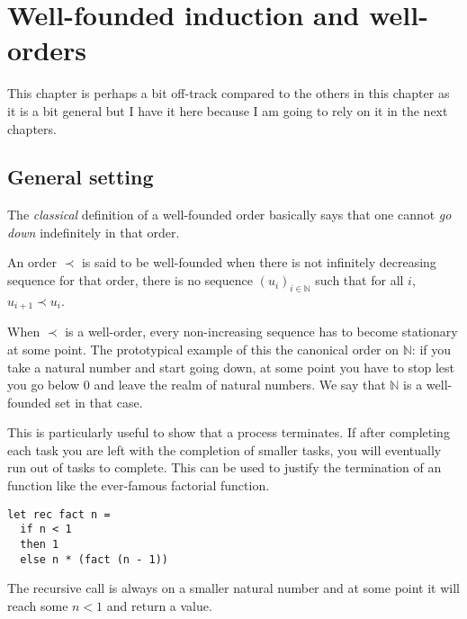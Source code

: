 \chapter{Well-founded induction and well-orders}

This chapter is perhaps a bit off-track compared to the others in this chapter
as it is a bit general but I have it here because I am going to rely on it in
the next chapters.

\section{General setting}

The \emph{classical} definition of a well-founded order basically says that one
cannot \emph{go down} indefinitely in that order.

\begin{definition}
  An order \(\prec\) is said to be well-founded when there is not infinitely
  decreasing sequence for that order, \ie there is no sequence
  \((u_i)_{i \in \mathbb{N}}\) such that for all \(i\), \(u_{i+1} \prec u_i\).
\end{definition}

When \(\prec\) is a well-order, every non-increasing sequence has to become
stationary at some point.
The prototypical example of this the canonical order on \(\mathbb{N}\): if you
take a natural number and start going down, at some point you have to stop lest
you go below \(0\) and leave the realm of natural numbers.
We say that \(\mathbb{N}\) is a well-founded set in that case.

This is particularly useful to show that a process terminates. If after
completing each task you are left with the completion of smaller tasks,
you will eventually run out of tasks to complete.
This can be used to justify the termination of an \ocaml function like the
ever-famous factorial function.
\begin{verbatim}
let rec fact n =
  if n < 1
  then 1
  else n * (fact (n - 1))
\end{verbatim}
The recursive call is always on a smaller natural number and at some point it
will reach some \(n < 1\) and return a value.

